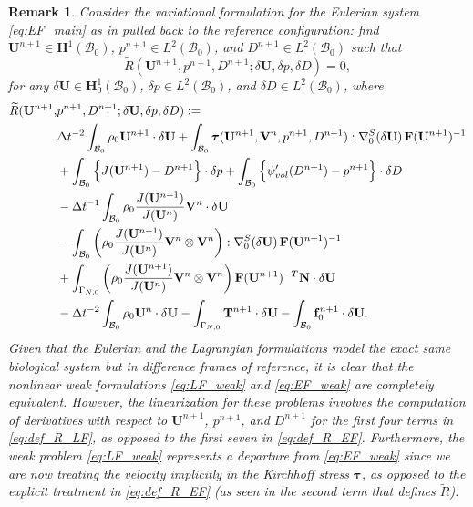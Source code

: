 \documentclass{sfuthesis}
\numberwithin{equation}{section}
\numberwithin{figure}{chapter}
\numberwithin{table}{chapter}
\newtheorem{remark}[theorem]{Remark}
\theoremstyle{definition}
\def\*#1{{\mathbf{#1}}} %
\newcommand{\B}{\mathcal{B}}
\def\btau{{\bm{\tau}}}
\begin{document}
\begin{remark}
    Consider the variational formulation for the Eulerian system \eqref{eq:EF_main} as in \cite[Equation 6.22]{Seba} pulled back to the reference configuration: find $\*U^{n+1} \in \*H^1(\B_0)$, $p^{n+1} \in L^2(\B_0)$, and $D^{n+1} \in L^2(\B_0)$ such that
    \begin{equation} \label{eq:EF_weak}
        \widetilde{R}(\*U^{n+1},p^{n+1},D^{n+1} ; \delta\*U, \delta p, \delta D) = 0,
    \end{equation}
    for any $\delta\*U \in \*H_0^1(\B_0)$, $\delta p \in L^2(\B_0)$, and $\delta D \in L^2(\B_0)$, where
    \vspace*{-0.5em}
    \begin{align} \label{eq:def_R_EF}
        \notag \widetilde{R}(\*U^{n+1},&p^{n+1},D^{n+1} ; \delta\*U, \delta p, \delta D) := \\
        \notag &\Delta t^{-2} \int_{\B_0} \rho_0 \*U^{n+1} \cdot \delta \*U + \int_{\B_0} \btau(\*U^{n+1},\*V^n, p^{n+1}, D^{n+1}) : \nabla^S_0(\delta\*U) \, \*F(\*U^{n+1})^{-1} \\
        \notag &+ \int_{\B_0} \Big\{  J(\*U^{n+1}) - D^{n+1} \Big\} \cdot \delta p + \int_{\B_0} \Big\{ \psi'_{vol}(D^{n+1}) - p^{n+1} \Big\} \cdot \delta D  \\
        \notag &- \Delta t^{-1} \int_{\B_0} \rho_0 \dfrac{J(\*U^{n+1})}{J(\*U^{n})} \*V^n \cdot \delta\*U \\
        \notag &-\int_{\B_0} \left(\rho_0 \dfrac{J(\*U^{n+1})}{J(\*U^{n})} \*V^n \otimes \*V^n\right) : \nabla^S_0(\delta \*U) \, \*F(\*U^{n+1})^{-1} \\
        \notag &+ \int_{\Gamma_{N,0}}  \left(\rho_0 \dfrac{J(\*U^{n+1})}{J(\*U^{n})} \*V^n \otimes \*V^n \right) \*F(\*U^{n+1})^{-T} \*N \cdot \delta \*U \\
        &- \Delta t^{-2} \int_{\B_0} \rho_0 \*U^n \cdot \delta \*U - \int_{\Gamma_{N,0}} \*T^{n+1} \cdot \delta\*U - \int_{\B_0} \*f_0^{n+1} \cdot \delta \*U.
    \end{align}
    Given that the Eulerian and the Lagrangian formulations model the exact same biological system but in difference frames of reference, it is clear that the nonlinear weak formulations \eqref{eq:LF_weak} and \eqref{eq:EF_weak} are completely equivalent. However, the linearization for these problems involves the computation of derivatives with respect to $\*U^{n+1}$, $p^{n+1}$, and $D^{n+1}$ for the first four terms in \eqref{eq:def_R_LF}, as opposed to the first seven in \eqref{eq:def_R_EF}. Furthermore, the weak problem \eqref{eq:LF_weak} represents a departure from \eqref{eq:EF_weak} since we are now treating the velocity implicitly in the Kirchhoff stress $\btau$, as opposed to the explicit treatment in \eqref{eq:def_R_EF} (as seen in the second term that defines $\widetilde{R}$).
\end{remark}
\end{document}
